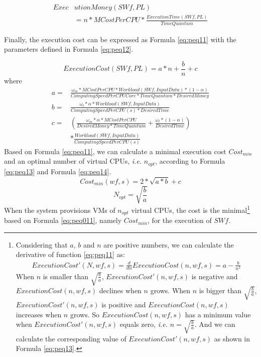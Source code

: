 \begin{equation}\label{eq:peq110}
\begin{split}
Exec&utionMoney( SWf, PL ) \\&= n * MCostPerCPU * \frac{ExecutionTime( SWf, PL )}{TimeQuantum}
\end{split}
\end{equation}

Finally, the execution cost can be expressed as Formula \ref{eq:peq11} with the parameters defined in Formula \ref{eq:peq12}.

\begin{equation}\label{eq:peq11}
ExecutionCost( SWf, PL ) = a * n + \frac{b}{n} + c 
\end{equation}
where
\begin{equation}\label{eq:peq12}
\begin{split}
a = & \frac{\omega_m * MCostPerCPU * Workload( SWf, InputData ) * ( 1 - \alpha )}{ComputingSpeedPerCPUCore * TimeQuantum * DesiredMoney} \\
b = & \frac{\omega_t * \alpha * Workload( SWf, InputData )}{ComputingSpeedPerCPU( s ) * DesiredTime} \\
c = & (\frac{\omega_m * \alpha * MCostPerCPU}{DesiredMoney * TimeQuantum} + \frac{\omega_t * (1 - \alpha) }{DesiredTime} )
\\&* \frac{Workload( SWf, InputData )}{ComputingSpeedPerCPU( s )} 
\end{split}
\end{equation}
Based on Formula \ref{eq:peq11}, we can calculate a minimal execution cost $Cost_{min}$ and an optimal number of virtual CPUs, \textit{i.e.} $n_{opt}$, according to Formula \ref{eq:peq13} and Formula \ref{eq:peq14}. 
\begin{equation}\label{eq:peq13}
Cost_{min}(wf,s) = 2 * \sqrt{a * b} + c
\end{equation}
\begin{equation}\label{eq:peq14}
\boxed{
N_{opt} = \sqrt{ \frac{b}{a} }
}
\end{equation}
When the system provisions VMs of $n_{opt}$ virtual CPUs, the cost is the minimal\footnote{
Considering that $a$, $b$ and $n$ are positive numbers, we can calculate the derivative of function \ref{eq:peq11} as:
\begin{equation}\label{eq:peq01}
\begin{split}
ExecutionCost'( N, wf, s ) = \frac{d}{dn}ExecutionCost( n, wf, s ) = a - \frac{b}{n^2}
\end{split}
\end{equation}
When $n$ is smaller than $\sqrt{\frac{b}{a}}$, $ExecutionCost'( n, wf, s )$ is negative and $ExecutionCost( n, wf, s )$ declines when $n$ grows. When $n$ is bigger than $\sqrt{\frac{b}{a}}$, $ExecutionCost'( n, wf, s )$ is positive and $ExecutionCost( n, wf, s )$ increases when $n$ grows. So $ExecutionCost( n, wf, s )$ has a minimum value when $ExecutionCost'( n, wf, s )$ equals zero, \textit{i.e.} $n = \sqrt{\frac{b}{a}}$. And we can calculate the corresponding value of $ExecutionCost'( n, wf, s )$ as shown in Formula \ref{eq:peq13}.}  based on Formula \ref{eq:peq011}, namely $Cost_{min}$, for the execution of $SWf$.

